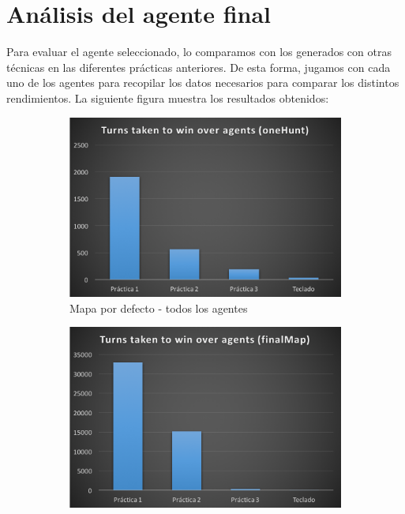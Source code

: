 \documentclass[12pt]{article}
\begin{document}
\newpage
\section{Análisis del agente final}


Para evaluar el agente seleccionado, lo comparamos con los generados con otras técnicas en las diferentes prácticas anteriores. De esta forma, jugamos con cada uno de los agentes para recopilar los datos necesarios para comparar los distintos rendimientos. La siguiente figura muestra los resultados obtenidos:

\begin{figure}[h]
    \centering
    \begin{subfigure}{.5\textwidth}
        \centering
        \includegraphics[width=.85\linewidth]{bmap_c}
        \caption{Mapa por defecto - todos los agentes}
        \label{fig:sub1}
    \end{subfigure}%
    \begin{subfigure}{.5\textwidth}
        \centering
        \includegraphics[width=.85\linewidth]{fmap_c}

\end{subfigure}
\end{figure}
\end{document}

